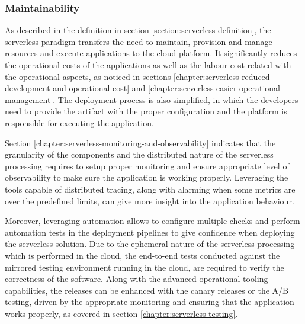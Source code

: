 
\subsubsection{Maintainability} \label{chapter:serverless-suitability-maintainability}

As described in the definition in section \ref{section:serverless-definition}, the serverless paradigm transfers the need to maintain, provision and manage resources and execute applications to the cloud platform. It significantly reduces the operational costs of the applications as well as the labour cost related with the operational aspects, as noticed in sections \ref{chapter:serverless-reduced-development-and-operational-cost} and \ref{chapter:serverless-easier-operational-management}. The deployment process is also simplified, in which the developers need to provide the artifact with the proper configuration and the platform is responsible for executing the application.

Section \ref{chapter:serverless-monitoring-and-observability} indicates that the granularity of the components and the distributed nature of the serverless processing requires to setup proper monitoring and ensure appropriate level of observability to make sure the application is working properly.
Leveraging the tools capable of distributed tracing, along with alarming when some metrics are over the predefined limits, can give more insight into the application behaviour.

Moreover, leveraging automation allows to configure multiple checks and perform automation tests in the deployment pipelines to give confidence when deploying the serverless solution. Due to the ephemeral nature of the serverless processing which is performed in the cloud, the end-to-end tests conducted against the mirrored testing environment running in the cloud, are required to verify the correctness of the software. Along with the advanced operational tooling capabilities, the releases can be enhanced with the canary releases or the A/B testing, driven by the appropriate monitoring and ensuring that the application works properly, as covered in section \ref{chapter:serverless-testing}.

